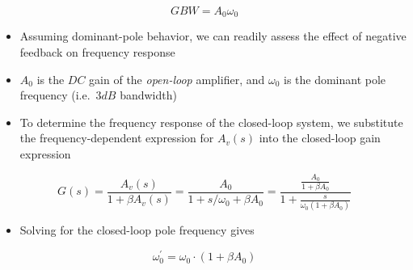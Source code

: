 \documentclass[11pt]{article}
\providecommand{\tightlist}{%
      \setlength{\itemsep}{0pt}\setlength{\parskip}{0pt}}
\begin{document}
\begin{equation}
GBW = A_0 \omega_0
\end{equation}

    \begin{itemize}
\tightlist
\item
  Assuming dominant-pole behavior, we can readily assess the effect of
  negative feedback on frequency response
\item
  \(A_0\) is the \(DC\) gain of the \emph{open-loop} amplifier, and
  \(\omega_0\) is the dominant pole frequency (i.e.~\(3dB\) bandwidth)
\end{itemize}

    \begin{itemize}
\tightlist
\item
  To determine the frequency response of the closed-loop system, we
  substitute the frequency-dependent expression for \(A_v(s)\) into the
  closed-loop gain expression
\end{itemize}

\begin{equation}
G(s) = \dfrac{A_{v}(s)}{1+\beta A_{v}(s)} = \dfrac{A_0}{1+s/\omega_0 + \beta A_0} = \dfrac{\frac{A_0}{1+\beta A_0}}{1+\frac{s}{\omega_0 (1+\beta A_0)}}
\end{equation}

\begin{itemize}
\tightlist
\item
  Solving for the closed-loop pole frequency gives
\end{itemize}

\begin{equation}
\omega_0^{'} = \omega_0\cdot(1+\beta A_0)
\end{equation}
\end{document}

